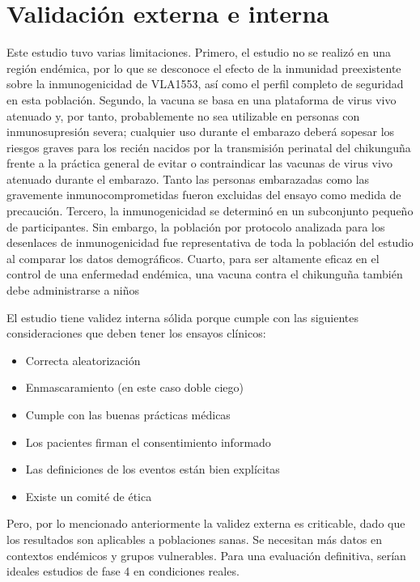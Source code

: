 \documentclass[
]{article}
\begin{document}
\section{Validación externa e
interna}\label{validaciuxf3n-externa-e-interna}

Este estudio tuvo varias limitaciones. Primero, el estudio no se realizó
en una región endémica, por lo que se desconoce el efecto de la
inmunidad preexistente sobre la inmunogenicidad de VLA1553, así como el
perfil completo de seguridad en esta población. Segundo, la vacuna se
basa en una plataforma de virus vivo atenuado y, por tanto,
probablemente no sea utilizable en personas con inmunosupresión severa;
cualquier uso durante el embarazo deberá sopesar los riesgos graves para
los recién nacidos por la transmisión perinatal del chikunguña frente a
la práctica general de evitar o contraindicar las vacunas de virus vivo
atenuado durante el embarazo. Tanto las personas embarazadas como las
gravemente inmunocomprometidas fueron excluidas del ensayo como medida
de precaución. Tercero, la inmunogenicidad se determinó en un
subconjunto pequeño de participantes. Sin embargo, la población por
protocolo analizada para los desenlaces de inmunogenicidad fue
representativa de toda la población del estudio al comparar los datos
demográficos. Cuarto, para ser altamente eficaz en el control de una
enfermedad endémica, una vacuna contra el chikunguña también debe
administrarse a niños

El estudio tiene validez interna sólida porque cumple con las siguientes
consideraciones que deben tener los ensayos clínicos:

\begin{itemize}
\item
  Correcta aleatorización
\item
  Enmascaramiento (en este caso doble ciego)
\item
  Cumple con las buenas prácticas médicas
\item
  Los pacientes firman el consentimiento informado
\item
  Las definiciones de los eventos están bien explícitas
\item
  Existe un comité de ética
\end{itemize}

Pero, por lo mencionado anteriormente la validez externa es criticable,
dado que los resultados son aplicables a poblaciones sanas. Se necesitan
más datos en contextos endémicos y grupos vulnerables. Para una
evaluación definitiva, serían ideales estudios de fase 4 en condiciones
reales.
\end{document}
